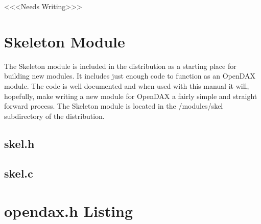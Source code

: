 <<<Needs Writing>>>

\appendix



\chapter{Skeleton Module}
The Skeleton module is included in the distribution as a starting place for building new modules.  It includes just enough code to function as an OpenDAX module.  The code is well documented and when used with this manual it will, hopefully, make writing a new module for OpenDAX a fairly simple and straight forward process.  The Skeleton module is located in the /modules/skel subdirectory of the distribution.

\section{skel.h}
\begin{small}

\end{small}
\section{skel.c}
\begin{small}

\end{small}


\chapter{opendax.h Listing}
\begin{small}

\end{small}

%

\printindex

